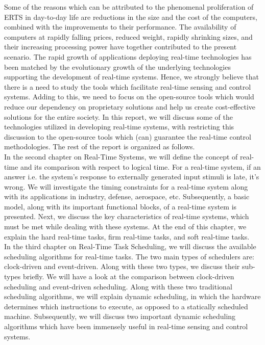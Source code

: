 \documentclass[12pt]{report}
\begin{document}
Some of the reasons which can be attributed to the phenomenal proliferation of ERTS in day-to-day life are reductions in the size and the cost of the computers, combined with the improvements to their performance. The availability of computers at rapidly falling prices, reduced weight, rapidly shrinking sizes, and their increasing processing power have together contributed to the present scenario. The rapid growth of applications deploying real-time technologies has been matched by the evolutionary growth of the underlying technologies supporting the development of real-time systems. Hence, we strongly believe that there is a need to study the tools which facilitate real-time sensing and control systems. Adding to this, we need to focus on the open-source tools which would reduce our dependency on proprietary solutions and help us create cost-effective solutions for the entire society. In this report, we will discuss some of the technologies utilized in developing real-time systems, with restricting this discussion to the open-source tools which (can) guarantee the real-time control methodologies. The rest of the report is organized as follows. \\ 

In the second chapter on Real-Time Systems, we will define the concept of real-time and its comparison with respect to logical time. For a real-time system, if an answer i.e. the system's response to externally generated input stimuli is late, it's wrong. We will investigate the timing constraints for a real-time system along with its applications in industry, defense, aerospace, etc. Subsequently, a basic model, along with its important functional blocks, of a real-time system is presented. Next, we discuss the key characteristics of real-time systems, which must be met while dealing with these systems. At the end of this chapter, we explain the hard real-time tasks, firm real-time tasks, and soft real-time tasks. \\ 

In the third chapter on Real-Time Task Scheduling, we will discuss the available scheduling algorithms for real-time tasks. The two main types of schedulers are: clock-driven and event-driven. Along with these two types, we discuss their sub-types briefly. We will have a look at the comparison between clock-driven scheduling and event-driven scheduling. Along with these two traditional scheduling algorithms, we will explain dynamic scheduling, in which the hardware determines which instructions to execute, as opposed to a statically scheduled machine. Subsequently, we will discuss two important dynamic scheduling algorithms which have been immensely useful in real-time sensing and control systems. \\ 
\end{document}
